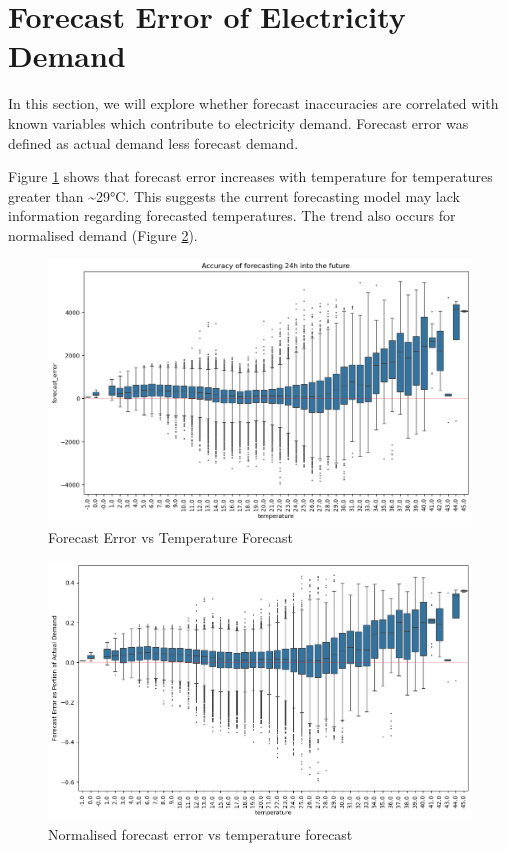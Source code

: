 \documentclass[mstat,12pt]{unswthesis}
\begin{document}
\section{Forecast Error of Electricity Demand}\label{forecast-error-of-electricity-demand}

In this section, we will explore whether forecast inaccuracies are correlated with known variables which contribute to electricity demand. Forecast error was defined as actual demand less forecast demand.

\bigskip

Figure \ref{fig:errorvtemp} shows that forecast error increases with temperature for temperatures greater than \textasciitilde29°C. This suggests the current forecasting model may lack information regarding forecasted temperatures. The trend also occurs for normalised demand (Figure \ref{fig:relerrorvtemp}).

\begin{figure}
\includegraphics[width=1\linewidth,height=0.4\textheight]{images/forecastErrorTemp} \caption{Forecast Error vs Temperature Forecast}\label{fig:errorvtemp}
\end{figure}

\begin{figure}
\includegraphics[width=1\linewidth,height=0.4\textheight]{images/PortionErrorTemp} \caption{Normalised forecast error vs temperature forecast}\label{fig:relerrorvtemp}
\end{figure}
\end{document}
